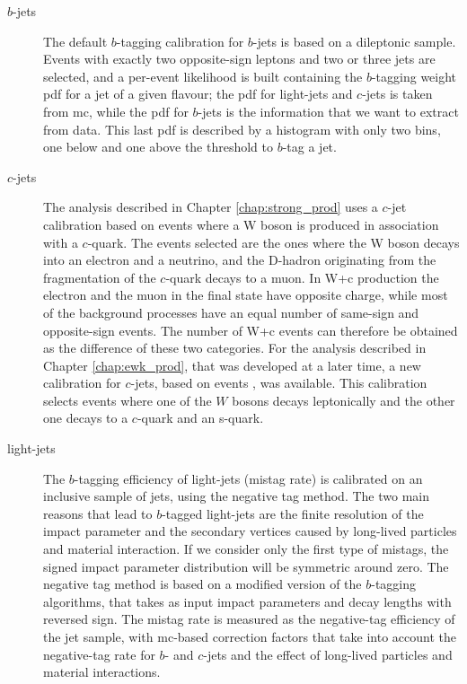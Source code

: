 \begin{description}

\item[$b$-jets] The default $b$-tagging calibration for $b$-jets is based on a \ttbar dileptonic sample. Events with exactly two opposite-sign leptons
and two or three jets are selected, and a per-event likelihood is built containing the $b$-tagging weight \gls{pdf} for a jet of a given flavour;
the \gls{pdf} for light-jets and $c$-jets is taken from \gls{mc}, while the \gls{pdf} for $b$-jets is the information that we want to extract from data.
This last \gls{pdf} is described by a histogram with only two bins, one below and one above the threshold to $b$-tag a jet. 


\item[$c$-jets] The analysis described in Chapter \ref{chap:strong_prod} uses a $c$-jet calibration based on events where a W boson 
is produced in association with a $c$-quark. The events selected are the ones where the W boson decays into an electron and a neutrino,
and the D-hadron originating from the fragmentation of the $c$-quark decays to a muon. 
In W+c production the electron and the muon in the final state have opposite charge, 
while most of the background processes have an equal number of same-sign and opposite-sign events. The number of W+c events can therefore 
be obtained as the difference of these two categories.
For the analysis described in Chapter \ref{chap:ewk_prod}, that was developed at a later time, a new calibration for $c$-jets, 
based on \ttbar events \cite{ATLAS:2018bpl}, was available. 
This calibration selects \ttbar events where one of the $W$ bosons decays leptonically and the other one decays to a $c$-quark and an s-quark. 

\item[light-jets] The $b$-tagging efficiency of light-jets (mistag rate) is calibrated on an inclusive sample of jets, using the negative tag method.
The two main reasons that lead to $b$-tagged light-jets are the finite resolution of the impact parameter and the secondary vertices caused
by long-lived particles and material interaction. If we consider only the first type of mistags, the signed impact parameter distribution 
will be symmetric around zero. 
The negative tag method is based on a modified version of the $b$-tagging algorithms, that takes as input impact parameters and decay lengths with
reversed sign. The mistag rate is measured as the negative-tag efficiency of the jet sample, with \gls{mc}-based correction factors that take into account 
the negative-tag rate for $b$- and $c$-jets and the effect of long-lived particles and material interactions.

\end{description}

